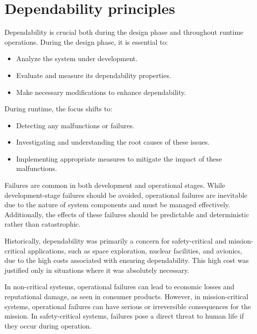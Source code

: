 \section{Dependability principles}

Dependability is crucial both during the design phase and throughout runtime operations.
During the design phase, it is essential to:
\begin{itemize}
    \item Analyze the system under development.
    \item Evaluate and measure its dependability properties.
    \item Make necessary modifications to enhance dependability.
\end{itemize}
During runtime, the focus shifts to:
\begin{itemize}
    \item Detecting any malfunctions or failures.
    \item Investigating and understanding the root causes of these issues.
    \item Implementing appropriate measures to mitigate the impact of these malfunctions.
\end{itemize}
Failures are common in both development and operational stages. 
While development-stage failures should be avoided, operational failures are inevitable due to the nature of system components and must be managed effectively. 
Additionally, the effects of these failures should be predictable and deterministic rather than catastrophic.

Historically, dependability was primarily a concern for safety-critical and mission-critical applications, such as space exploration, nuclear facilities, and avionics, due to the high costs associated with ensuring dependability. 
This high cost was justified only in situations where it was absolutely necessary.

In non-critical systems, operational failures can lead to economic losses and reputational damage, as seen in consumer products. 
However, in mission-critical systems, operational failures can have serious or irreversible consequences for the mission. 
In safety-critical systems, failures pose a direct threat to human life if they occur during operation.